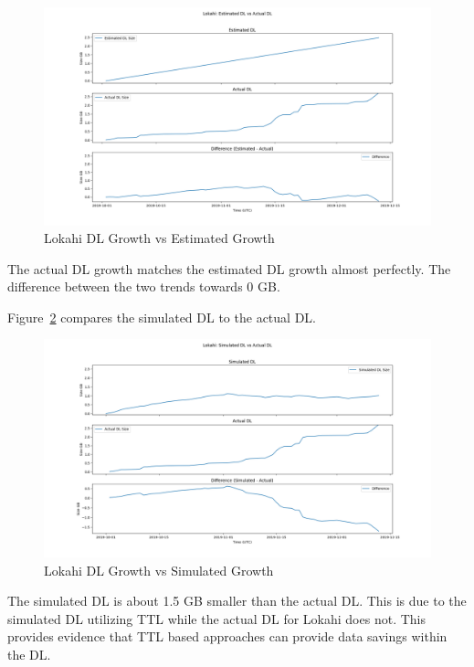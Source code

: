 \begin{figure}[H]
    \centering
    \includegraphics[width=\linewidth]{figures/lokahi_actual_dl_vs_est.png}
    \caption{Lokahi DL Growth vs Estimated Growth}
    \label{fig:lokahi_actual_dl_vs_est}
\end{figure}

The actual DL growth matches the estimated DL growth almost perfectly. The difference between the two trends towards 0 GB.

Figure~\ref{fig:lokahi_actual_dl_vs_sim} compares the simulated DL to the actual DL.

\begin{figure}[H]
    \centering
    \includegraphics[width=\linewidth]{figures/lokahi_actual_dl_vs_sim.png}
    \caption{Lokahi DL Growth vs Simulated Growth}
    \label{fig:lokahi_actual_dl_vs_sim}
\end{figure}

The simulated DL is about 1.5 GB smaller than the actual DL. This is due to the simulated DL utilizing TTL while the actual DL for Lokahi does not. This provides evidence that TTL based approaches can provide data savings within the DL.

